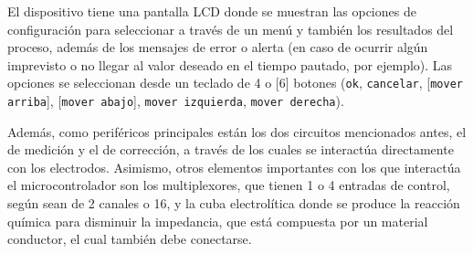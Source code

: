 El dispositivo tiene una pantalla LCD donde se muestran las opciones de configuración para seleccionar a través de un menú y también los resultados del proceso, además de los mensajes de error o alerta (en caso de ocurrir algún imprevisto o no llegar al valor deseado en el tiempo pautado, por ejemplo). Las opciones se seleccionan desde un teclado de 4 o [6] botones (\texttt{ok}, \texttt{cancelar}, [\texttt{mover arriba}], [\texttt{mover abajo}], \texttt{mover izquierda}, \texttt{mover derecha}).

Además, como periféricos principales están los dos circuitos mencionados antes, el de medición y el de corrección, a través de los cuales se interactúa directamente con los electrodos. Asimismo, otros elementos importantes con los que interactúa el microcontrolador son los multiplexores, que tienen 1 o 4 entradas de control, según sean de 2 canales o 16, y la cuba electrolítica donde se produce la reacción química para disminuir la impedancia, que está compuesta por un material conductor, el cual también debe conectarse.



